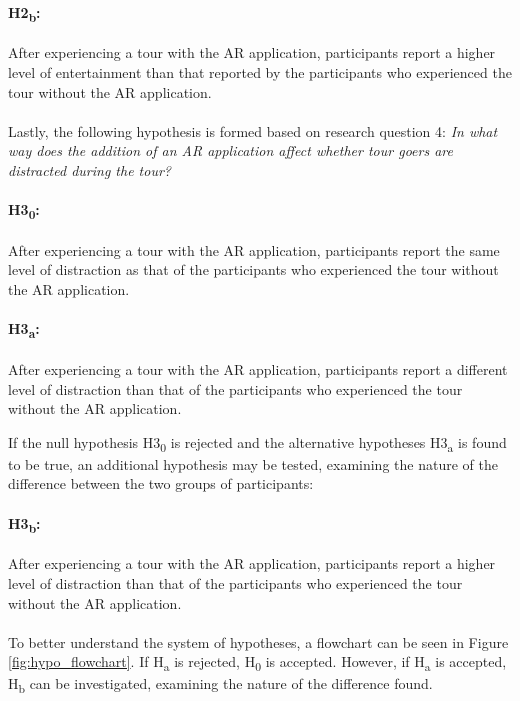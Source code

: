 \paragraph{H2\textsubscript{b}:} After experiencing a tour with the AR application, participants report a higher level of entertainment than that reported by the participants who experienced the tour without the AR application.\\
\\
Lastly, the following hypothesis is formed based on research question 4: \textit{In what way does the addition of an AR application affect whether tour goers are distracted during the tour?}

\paragraph{H3\textsubscript{0}:} After experiencing a tour with the AR application, participants report the same level of distraction as that of the participants who experienced the tour without the AR application.

\paragraph{H3\textsubscript{a}:}After experiencing a tour with the AR application, participants report a different level of distraction than that of the participants who experienced the tour without the AR application.\pagebreak

If the null hypothesis H3\textsubscript{0} is rejected and the alternative hypotheses H3\textsubscript{a} is found to be true, an additional hypothesis may be tested, examining the nature of the difference between the two groups of participants:

\paragraph{H3\textsubscript{b}:} After experiencing a tour with the AR application, participants report a higher level of distraction than that of the participants who experienced the tour without the AR application.\\
\\
To better understand the system of hypotheses, a flowchart can be seen in Figure \ref{fig:hypo_flowchart}. If H\textsubscript{a} is rejected, H\textsubscript{0} is accepted. However, if H\textsubscript{a} is accepted, H\textsubscript{b} can be investigated, examining the nature of the difference found.

